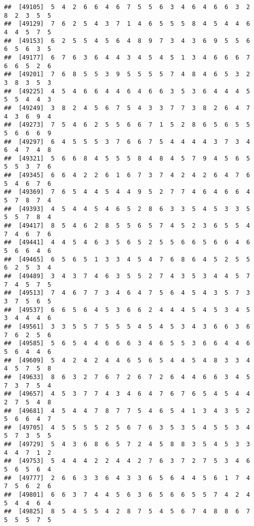 \documentclass[
]{book}
\begin{document}
\begin{verbatim}
##  [49105]  5  4  2  6  6  4  6  7  5  5  6  3  4  6  4  6  6  3  2  8  2  3  5  5
##  [49129]  7  6  2  5  4  3  7  1  4  6  5  5  5  8  4  5  4  4  6  4  4  5  7  5
##  [49153]  6  2  5  5  4  5  6  4  8  9  7  3  4  3  6  9  5  5  6  6  5  6  3  5
##  [49177]  6  7  6  3  6  4  4  3  4  5  4  5  1  3  4  6  6  6  7  6  6  5  2  6
##  [49201]  7  6  8  5  5  3  9  5  5  5  5  7  4  8  4  6  5  3  2  3  8  3  5  3
##  [49225]  4  5  4  6  6  4  4  6  4  6  6  3  5  3  6  4  4  4  5  5  5  4  4  3
##  [49249]  3  8  2  4  5  6  7  5  4  3  3  7  7  3  8  2  6  4  7  4  3  6  9  4
##  [49273]  7  5  4  6  2  5  5  6  6  7  1  5  2  8  6  5  6  5  5  5  6  6  6  9
##  [49297]  6  4  5  5  5  3  7  6  6  7  5  4  4  4  4  3  7  3  4  6  4  7  4  8
##  [49321]  5  6  6  8  4  5  5  5  8  4  8  4  5  7  9  4  5  6  5  5  5  3  7  6
##  [49345]  6  6  4  2  2  6  1  6  7  3  7  4  2  4  2  6  4  7  6  5  4  6  7  6
##  [49369]  7  6  5  4  4  5  4  4  9  5  2  7  7  4  6  4  6  6  4  5  7  8  7  4
##  [49393]  4  5  4  4  5  4  6  5  2  8  6  3  3  5  4  5  3  3  5  5  5  7  8  4
##  [49417]  8  5  4  6  2  8  5  5  6  5  7  4  5  2  3  6  5  5  4  7  4  6  7  6
##  [49441]  4  4  5  4  6  3  5  6  5  2  5  5  6  6  5  6  6  4  6  5  6  6  4  6
##  [49465]  6  5  6  5  1  3  3  4  5  4  7  6  8  6  4  5  2  5  5  6  2  5  3  4
##  [49489]  3  4  3  7  4  6  3  5  5  2  7  4  3  5  3  4  4  5  7  7  4  5  7  5
##  [49513]  7  4  6  7  7  3  4  6  4  7  5  6  4  5  4  3  5  7  3  3  7  5  6  5
##  [49537]  6  6  5  6  4  5  3  6  6  2  4  4  4  5  4  5  3  4  5  3  4  4  4  6
##  [49561]  3  3  5  5  7  5  5  5  4  5  4  5  3  4  3  6  6  3  6  7  6  2  5  6
##  [49585]  5  6  5  4  4  6  6  6  3  4  6  5  5  3  6  6  4  4  6  5  6  4  4  6
##  [49609]  5  4  2  4  2  4  4  6  5  6  5  4  4  5  4  8  3  3  4  4  5  7  5  8
##  [49633]  8  6  3  2  7  6  7  2  6  7  2  6  4  4  6  6  3  4  5  7  3  7  5  4
##  [49657]  4  5  3  7  7  4  3  4  6  4  7  6  7  6  5  4  5  4  4  2  7  5  4  8
##  [49681]  4  5  4  4  7  8  7  7  5  4  6  5  4  1  3  4  3  5  2  5  6  6  4  7
##  [49705]  4  5  5  5  5  2  5  6  7  6  3  5  3  5  4  5  5  3  4  5  7  3  5  5
##  [49729]  5  4  3  6  8  6  5  7  2  4  5  8  8  3  5  4  5  3  3  4  4  7  1  2
##  [49753]  5  4  4  4  2  2  4  4  2  7  6  3  7  2  7  5  3  4  6  5  6  5  6  4
##  [49777]  2  6  6  3  3  6  4  3  3  6  5  6  4  4  5  6  1  7  4  7  5  6  2  6
##  [49801]  6  6  3  7  4  4  5  6  3  6  5  6  6  5  5  7  4  2  4  5  4  4  6  4
##  [49825]  8  5  4  5  5  4  2  8  7  5  4  5  6  7  4  8  8  6  7  5  5  5  7  5

\end{verbatim}
\end{document}
